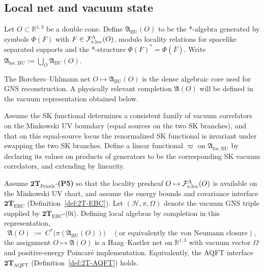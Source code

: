 \subsection{Local net and vacuum state}
\label{subsec:net-and-state}

\begin{definition}
\label{def:BU-core}
Let $O\subset\mathbb R^{1,3}$ be a double cone. Define $\mathfrak A_{\mathrm{BU}}(O)$
to be the *-algebra generated by symbols $\Phi(F)$ with $F\in\mathcal F_{\mathrm{s.loc}}^\Lambda(O)$, modulo
locality relations for spacelike separated supports and the *-structure
$\Phi(F)^*=\Phi(\overline F)$.  Write $\mathfrak A_{\mathrm{loc,BU}}:=\bigcup_O
\mathfrak A_{\mathrm{BU}}(O)$.
\end{definition}

\begin{remark}
The Borchers--Uhlmann net $O\mapsto\mathfrak A_{\mathrm{BU}}(O)$ is the dense
algebraic core used for GNS reconstruction.  A physically relevant completion
$\mathfrak A(O)$ will be defined in the vacuum representation obtained below.
\end{remark}

\begin{definition}
\label{def:omega-SK}
Assume the SK functional determines a consistent family of vacuum
correlators on the Minkowski UV boundary (equal sources on the two SK branches),
and that on this equal-source locus the renormalized SK functional is invariant
under swapping the two SK branches.
Define a linear functional $\varpi$ on $\mathfrak A_{\mathrm{loc,BU}}$ by
declaring its values on products of generators to be the corresponding SK
vacuum correlators, and extending by linearity.
\end{definition}

\begin{theorem}
\label{thm:subprogram1b-Wightman}
Assume $\mathbf{2T}_{\mathrm{Peierls}}$-\textbf{(P5)} so that the locality
presheaf $O\mapsto\mathcal F_{\mathrm{s.loc}}^\Lambda(O)$ is available on the Minkowski UV chart, and assume
the energy bounds and covariance interface $\mathbf{2T}_{\mathrm{EBC}}$
(Definition~\ref{def:2T-EBC}).  Let $(\mathcal H,\pi,\Omega)$ denote the vacuum
GNS triple supplied by $\mathbf{2T}_{\mathrm{EBC}}$-\textnormal{(0i)}.
Defining local algebras by completion in this representation,
\[
\mathfrak A(O)\ :=\ C^*\!\big(\pi(\mathfrak A_{\mathrm{BU}}(O))\big)
\quad(\text{or equivalently the von Neumann closure}),
\]
the assignment $O\mapsto\mathfrak A(O)$ is a Haag--Kastler net on $\mathbb R^{1,3}$
with vacuum vector $\Omega$ and positive-energy Poincar\'e implementation.
Equivalently, the AQFT interface $\mathbf{2T}_{\mathrm{AQFT}}$
(Definition~\ref{def:2T-AQFT}) holds.
\end{theorem}


